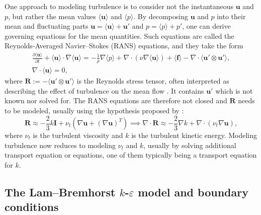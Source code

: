 One approach to modeling turbulence is to consider not the instantaneous \(\mathbf{u}\) and \(p\), but rather the mean values \(\langle \mathbf{u} \rangle\) and \( \langle p \rangle\). By decomposing \(\mathbf{u}\) and \(p\) into their mean and fluctuating parts \(\mathbf{u} = \langle \mathbf{u} \rangle + \mathbf{u}'\) and \(p = \langle p \rangle + p'\), one can derive governing equations for the mean quantities. Such equations are called the Reynolds-Averaged Navier--Stokes (RANS) equations, and they take the form
\begin{equation}\label{eq: RANS}
    \begin{split}
        \frac{\partial \langle \mathbf{u} \rangle}{\partial t} + \langle \mathbf{u} \rangle \cdot \nabla{\langle \mathbf{u} \rangle}
        = 
        -\frac{1}{\rho} \nabla \langle p \rangle + \nabla \cdot (\nu \nabla \langle \mathbf{u} \rangle ) + \langle \mathbf{f} \rangle - \nabla \cdot \langle \mathbf{u}' \otimes \mathbf{u}' \rangle,
        \\
        \nabla \cdot \langle \mathbf{u} \rangle 
        = 0,
    \end{split}
\end{equation}
where \(\mathbf{R} := - \langle \mathbf{u}' \otimes \mathbf{u}' \rangle\) is the Reynolds stress tensor, often interpreted as describing the effect of turbulence on the mean flow \citep{wilcox_turbulence_2006}. It contains \(\mathbf{u}'\) which is not known nor solved for. The RANS equations are therefore not closed and \(\mathbf{R}\) needs to be modeled, usually using the hypothesis proposed by \cite{boussinesq__essai_1877}:
\begin{equation}\label{eq: Boussinesq hypothesis}
    \mathbf{R} 
    \approx 
    - \frac{2}{3}k \mathbf{I} 
    + \nu_t \left(\nabla{\mathbf{u}} 
    + (\nabla{\mathbf{u}})^T\right)
    \implies
    \nabla \cdot \mathbf{R} 
    \approx
    - \frac{2}{3} \nabla k 
    + \nabla \cdot \left( \nu_t \nabla \mathbf{u} \right),
\end{equation}
where \(\nu_t\) is the turbulent viscosity and \(k\) is the turbulent kinetic energy. Modeling turbulence now reduces to modeling \(\nu_t\) and \(k\), usually by solving additional transport equation or equations, one of them typically being a transport equation for \(k\).

\subsection{The Lam--Bremhorst \(k\)-\(\varepsilon\) model and boundary conditions}

